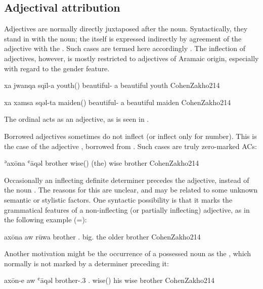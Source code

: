 \subsection{Adjectival attribution}

Adjectives are normally directly juxtaposed after the \prim noun. Syntactically, they stand in  with the \prim noun; the  itself is expressed indirectly by agreement of the adjective with the . Such cases are termed here accordingly . The inflection of adjectives, however, is mostly restricted to adjectives of Aramaic origin, especially with regard to the gender feature.

{xa jwanqa sqīl-a}
{\indef{} youth(\masc) beautiful-\masc}
{a beautiful youth}
{CohenZakho}{214}

{xa xamsa sqəl-ta}
{\indef{} maiden(\fem) beautiful-\fem}
{a beautiful maiden}
{CohenZakho}{214}

The ordinal  acts as an adjective, as is seen in . 

Borrowed adjectives sometimes do not inflect (or inflect only for number). This is the case of  the adjective , borrowed from  \citep[246a]{SabarDictionary}. Such cases are truly zero-marked ACs:

{ʾaxōna ʿāqəl}
{brother wise(\invar)}
{(the) wise brother}
{CohenZakho}{214}

Occasionally an inflecting definite determiner precedes the adjective, instead of the \prim noun \citep[215]{CohenZakho}. The reasons for this are unclear, and may be related to some unknown semantic or stylistic factors. One syntactic possibility is that it marks the grammatical features of a non-inflecting (or partially inflecting) adjective, as in the following example (=):


{axōna aw rūwa}
{brother .\masc{} big.\sg\footnotemark}
{the older brother}
{CohenZakho}{214}


Another motivation might be the occurrence of a possessed noun as the \prim, which normally is not marked by a determiner preceding it:

{axōn-e aw ʿāqəl}
{brother-\poss.3\masc{} .\masc{} wise(\invar)}
{his wise brother}
{CohenZakho}{214}

